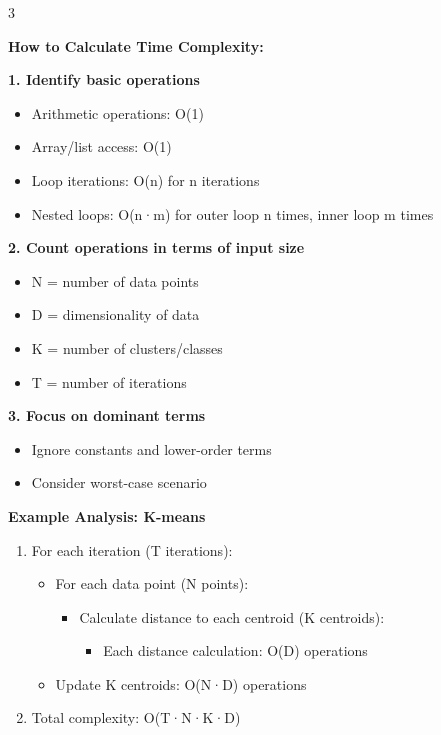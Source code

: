 \documentclass[10pt,landscape]{article}
\begin{document}
\begin{multicols}{3}
\begin{tcolorbox}[breakable, title=Time Complexity Analysis, colback=white]
\textbf{How to Calculate Time Complexity:}

\textbf{1. Identify basic operations}
\begin{itemize}[leftmargin=*,noitemsep,topsep=0pt]
    \item Arithmetic operations: O(1)
    \item Array/list access: O(1)
    \item Loop iterations: O(n) for n iterations
    \item Nested loops: O(n·m) for outer loop n times, inner loop m times
\end{itemize}

\textbf{2. Count operations in terms of input size}
\begin{itemize}[leftmargin=*,noitemsep,topsep=0pt]
    \item N = number of data points
    \item D = dimensionality of data
    \item K = number of clusters/classes
    \item T = number of iterations
\end{itemize}

\textbf{3. Focus on dominant terms}
\begin{itemize}[leftmargin=*,noitemsep,topsep=0pt]
    \item Ignore constants and lower-order terms
    \item Consider worst-case scenario
\end{itemize}

\textbf{Example Analysis: K-means}
\begin{enumerate}[leftmargin=*,noitemsep,topsep=0pt]
    \item For each iteration (T iterations):
    \begin{itemize}[leftmargin=*,noitemsep]
        \item For each data point (N points):
            \begin{itemize}[leftmargin=*,noitemsep]
                \item Calculate distance to each centroid (K centroids):
                    \begin{itemize}[leftmargin=*,noitemsep]
                        \item Each distance calculation: O(D) operations
                    \end{itemize}
            \end{itemize}
        \item Update K centroids: O(N·D) operations
    \end{itemize}
    \item Total complexity: O(T·N·K·D)
\end{enumerate}


\end{tcolorbox}
\end{multicols}
\end{document}
